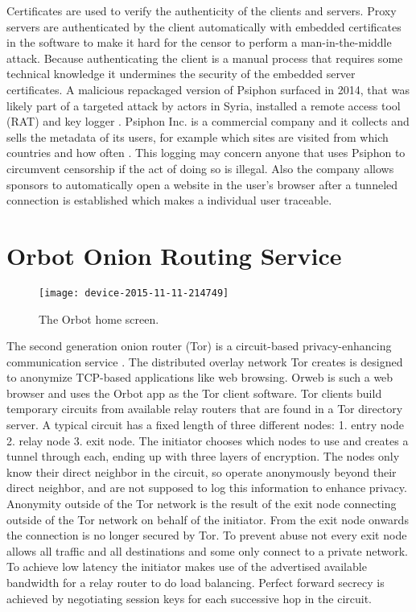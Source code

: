 \documentclass[conference,compsoc]{IEEEtran}
\begin{document}
Certificates are used to verify the authenticity of the clients and servers.
Proxy servers are authenticated by the client automatically with embedded certificates in the software to make it hard for the censor to perform a man-in-the-middle attack.
Because authenticating the client is a manual process that requires some technical knowledge it undermines the security of the embedded server certificates.
A malicious repackaged version of Psiphon surfaced in 2014, that was likely part of a targeted attack by actors in Syria, installed a remote access tool (RAT) and key logger \cite{scott2014malicious}.
Psiphon Inc. is a commercial company and it collects and sells the metadata of its users, for example which sites are visited from which countries and how often \cite{psiphon2015website}.
This logging may concern anyone that uses Psiphon to circumvent censorship if the act of doing so is illegal.
Also the company allows sponsors to automatically open a website in the user's browser after a tunneled connection is established which makes a individual user traceable.


\section{Orbot Onion Routing Service}

\begin{figure}[b!]
\centering
\texttt{[image: device-2015-11-11-214749]}
\caption{The Orbot home screen.}
\label{fig_orbot}
\end{figure}

The second generation onion router (Tor) is a circuit-based privacy-enhancing communication service \cite{dingledine2004tor}.
The distributed overlay network Tor creates is designed to anonymize TCP-based applications like web browsing.
Orweb is such a web browser and uses the Orbot app as the Tor client software.
Tor clients build temporary circuits from available relay routers that are found in a Tor directory server.
A typical circuit has a fixed length of three different nodes: 1. entry node 2. relay node 3. exit node.
The initiator chooses which nodes to use and creates a tunnel through each, ending up with three layers of encryption.
The nodes only know their direct neighbor in the circuit, so operate anonymously beyond their direct neighbor, and are not supposed to log this information to enhance privacy.
Anonymity outside of the Tor network is the result of the exit node connecting outside of the Tor network on behalf of the initiator.
From the exit node onwards the connection is no longer secured by Tor.
To prevent abuse not every exit node allows all traffic and all destinations and some only connect to a private network.
To achieve low latency the initiator makes use of the advertised available bandwidth for a relay router to do load balancing. \cite{Bauer:2007:LRA:1314333.1314336}
Perfect forward secrecy is achieved by negotiating session keys for each successive hop in the circuit.
\end{document}
